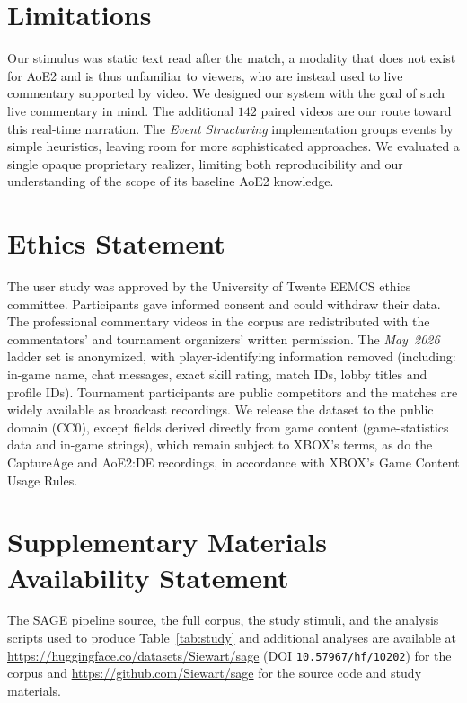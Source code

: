 \documentclass[11pt]{article}
\begin{document}
\section*{Limitations}
Our stimulus was static text read after the match, a modality that does not exist for AoE2 and is thus unfamiliar to viewers, who are instead used to live commentary supported by video. We designed our system with the goal of such live commentary in mind. The additional $142$ paired videos are our route toward this real-time narration. The \emph{Event Structuring} implementation groups events by simple heuristics, leaving room for more sophisticated approaches. We evaluated a single opaque proprietary realizer, limiting both reproducibility and our understanding of the scope of its baseline AoE2 knowledge.

\section*{Ethics Statement}
The user study was approved by the University of Twente EEMCS ethics committee. Participants gave informed consent and could withdraw their data. The professional commentary videos in the corpus are redistributed with the commentators' and tournament organizers' written permission. The \emph{May~2026} ladder set is anonymized, with player-identifying information removed (including: in-game name, chat messages, exact skill rating, match IDs, lobby titles and profile IDs). Tournament participants are public competitors and the matches are widely available as broadcast recordings. We release the dataset to the public domain (CC0), except fields derived directly from game content (game-statistics data and in-game strings), which remain subject to XBOX's terms, as do the CaptureAge and AoE2:DE recordings, in accordance with XBOX's Game Content Usage Rules.

\section*{Supplementary Materials Availability Statement}
The SAGE pipeline source, the full corpus, the study stimuli, and the analysis scripts used to produce Table~\ref{tab:study} and additional analyses are available at \url{https://huggingface.co/datasets/Siewart/sage} (DOI \texttt{10.57967/hf/10202}) for the corpus and \url{https://github.com/Siewart/sage} for the source code and study materials.

\end{document}
